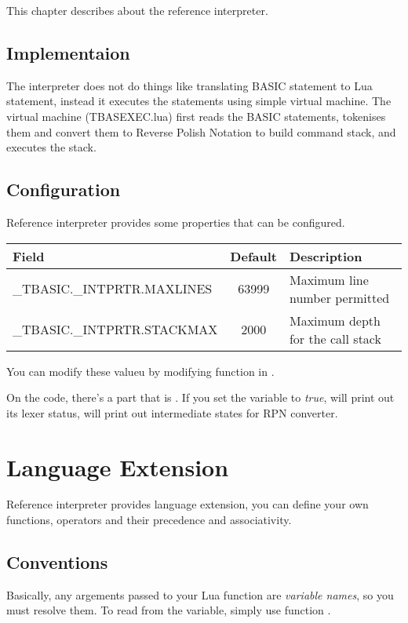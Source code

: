 This chapter describes about the reference interpreter.

\section{Implementaion}

The interpreter does not do things like translating BASIC statement to Lua statement, instead it executes the statements using simple virtual machine. The virtual machine (TBASEXEC.lua) first reads the BASIC statements, tokenises them and convert them to Reverse Polish Notation to build command stack, and executes the stack.


\section{Configuration}

Reference interpreter provides some properties that can be configured.

\begin{tabularx}{\textwidth}{l c X}
    \textbf{Field} & \textbf{Default} & \textbf{Description}
    \\
    \endhead
    _TBASIC._INTPRTR.MAXLINES & 63999 & Maximum line number permitted
    \\
    _TBASIC._INTPRTR.STACKMAX & 2000 & Maximum depth for the call stack
\end{tabularx}

You can modify these valueu by modifying  function in .

On the code, there's a part that is . If you set the variable to \emph{true},  will print out its lexer status,  will print out intermediate states for RPN converter.


\chapter{Language Extension}

Reference interpreter provides language extension, you can define your own functions, operators and their precedence and associativity.


\section{Conventions}

Basically, any argements passed to your Lua function are \emph{variable names}, so you must resolve them. To read from the variable, simply use function .

